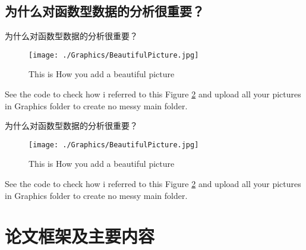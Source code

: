 \documentclass[aspectratio=169, 9pt]{beamer}
\begin{document}
\subsection{为什么对函数型数据的分析很重要？}
\begin{frame}{为什么对函数型数据的分析很重要？}
        \begin{minipage}[t]{\linewidth}
            \begin{center}
            \begin{figure}
                \centering
                \texttt{[image: ./Graphics/BeautifulPicture.jpg]}
             \caption{This is How you add a beautiful picture}
                \label{BFigure1} %
            \end{figure}
            \end{center}
        \end{minipage}
        See the code to check how i referred to this Figure \ref{BFigure1} and upload all your pictures in Graphics folder to create no messy main folder.
\end{frame}
\begin{frame}{为什么对函数型数据的分析很重要？}
        \begin{minipage}[t]{\linewidth}
            \begin{center}
            \begin{figure}
                \centering
                \texttt{[image: ./Graphics/BeautifulPicture.jpg]}
             \caption{This is How you add a beautiful picture}
                \label{BFigure1} %
            \end{figure}
            \end{center}
        \end{minipage}
        See the code to check how i referred to this Figure \ref{BFigure1} and upload all your pictures in Graphics folder to create no messy main folder.
\end{frame}


















\section{论文框架及主要内容}
\end{document}
